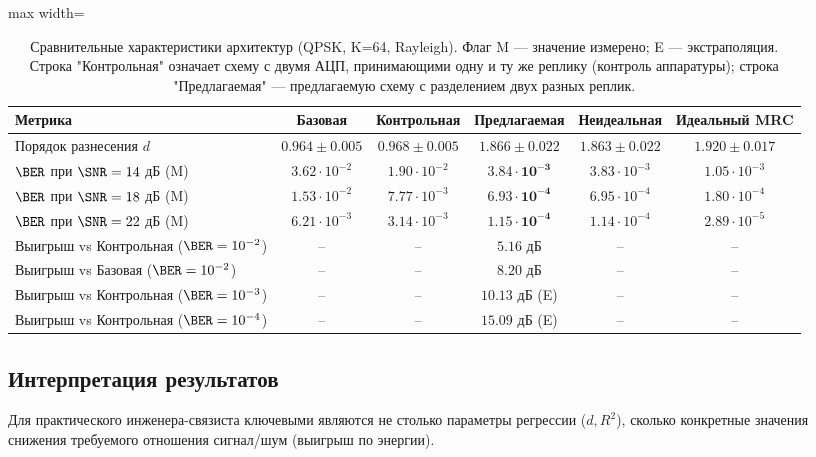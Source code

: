 \documentclass[a4paper,12pt]{article}
\numberwithin{equation}{section}
\begin{document}
\begin{table}[htbp]
\centering
\footnotesize
\caption{Сравнительные характеристики архитектур (QPSK, K=64, Rayleigh). Флаг M — значение измерено; E — экстраполяция. Строка "Контрольная" означает схему с двумя АЦП, принимающими одну и ту же реплику (контроль аппаратуры); строка "Предлагаемая" — предлагаемую схему с разделением двух разных реплик.}
\label{tab:results}
\begin{adjustbox}{max width=\textwidth}
\begin{tabular}{@{}lccccc@{}}
\toprule
\textbf{Метрика} & \textbf{Базовая} & \textbf{Контрольная} & \textbf{Предлагаемая} & \textbf{Неидеальная} & \textbf{Идеальный MRC} \\
\midrule
Порядок разнесения $d$ & $0.964 \pm 0.005$ & $0.968 \pm 0.005$ & $\mathbf{1.866 \pm 0.022}$ & $1.863 \pm 0.022$ & $1.920 \pm 0.017$ \\
$\BER$ при $\SNR=14$ дБ (M) & $3.62 \cdot 10^{-2}$ & $1.90 \cdot 10^{-2}$ & $\mathbf{3.84 \cdot 10^{-3}}$ & $3.83 \cdot 10^{-3}$ & $1.05 \cdot 10^{-3}$ \\
$\BER$ при $\SNR=18$ дБ (M) & $1.53 \cdot 10^{-2}$ & $7.77 \cdot 10^{-3}$ & $\mathbf{6.93 \cdot 10^{-4}}$ & $6.95 \cdot 10^{-4}$ & $1.80 \cdot 10^{-4}$ \\
$\BER$ при $\SNR=22$ дБ (M) & $6.21 \cdot 10^{-3}$ & $3.14 \cdot 10^{-3}$ & $\mathbf{1.15 \cdot 10^{-4}}$ & $1.14 \cdot 10^{-4}$ & $2.89 \cdot 10^{-5}$ \\
\midrule
Выигрыш vs Контрольная ($\BER=10^{-2}$) & -- & -- & $\mathbf{5.16}$ дБ & -- & -- \\
Выигрыш vs Базовая ($\BER=10^{-2}$) & -- & -- & $\mathbf{8.20}$ дБ & -- & -- \\
Выигрыш vs Контрольная ($\BER=10^{-3}$) & -- & -- & $10.13$ дБ (E) & -- & -- \\
Выигрыш vs Контрольная ($\BER=10^{-4}$) & -- & -- & $15.09$ дБ (E) & -- & -- \\
\bottomrule
\end{tabular}
\end{adjustbox}
\end{table}

\subsection{Интерпретация результатов}

Для практического инженера-связиста ключевыми являются не столько параметры регрессии ($d, R^2$), сколько конкретные значения снижения требуемого отношения сигнал/шум (выигрыш по энергии).
\end{document}
